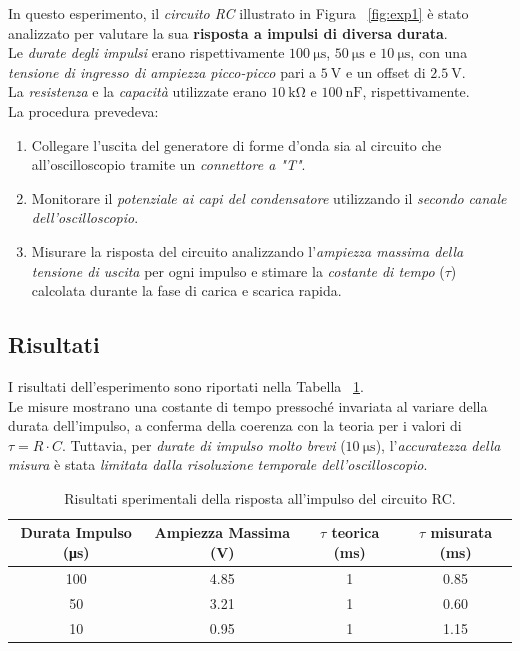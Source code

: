\documentclass[a4paper,10pt]{article}
\begin{document}
\begin{multicols}{2}
In questo esperimento, il \textit{circuito RC} illustrato in Figura ~\ref{fig:exp1} è stato analizzato per valutare la sua \textbf{risposta a impulsi di diversa durata}.\\
Le \textit{durate degli impulsi} erano rispettivamente \(\SI{100}{\micro\second}\), \(\SI{50}{\micro\second}\) e \(\SI{10}{\micro\second}\), con una \textit{tensione di ingresso di ampiezza picco-picco} pari a \(\SI{5}{\volt}\) e un offset di \(\SI{2.5}{\volt}\).\\
La \textit{resistenza} e la \textit{capacità} utilizzate erano \(\SI{10}{\kilo\ohm}\) e \(\SI{100}{\nano\farad}\), rispettivamente.\\
La procedura prevedeva:
\begin{enumerate}
    \item Collegare l'uscita del generatore di forme d’onda sia al circuito che all'oscilloscopio tramite un \textit{connettore a "T"}.
    \item Monitorare il \textit{potenziale ai capi del condensatore} utilizzando il \textit{secondo canale dell'oscilloscopio}.
    \item Misurare la risposta del circuito analizzando l’\textit{ampiezza massima della tensione di uscita} per ogni impulso e stimare la \textit{costante di tempo} (\(\tau\)) calcolata durante la fase di carica e scarica rapida.
\end{enumerate}

\end{multicols}

\subsection{Risultati}
I risultati dell’esperimento sono riportati nella Tabella ~\ref{tab:rc_impulse_response}.\\
Le misure mostrano una costante di tempo pressoché invariata al variare della durata dell’impulso, a conferma della coerenza con la teoria per i valori di \(\tau = R \cdot C\). Tuttavia, per \textit{durate di impulso molto brevi} (\(\SI{10}{\micro\second}\)), l’\textit{accuratezza della misura} è stata \textit{limitata dalla risoluzione temporale dell'oscilloscopio}.

\begin{table}[H]
\centering
\begin{tabular}{|c|c|c|c|}
\hline
\textbf{Durata Impulso (\si{\micro\second})} & \textbf{Ampiezza Massima (\si{\volt})} & \textbf{\(\tau\) teorica (\si{\milli\second})} & \textbf{\(\tau\) misurata (\si{\milli\second})} \\ \hline
100 & 4.85 & 1 & 0.85 \\ \hline
50 & 3.21 & 1 & 0.60 \\ \hline
10 & 0.95 & 1 & 1.15 \\ \hline
\end{tabular}
\caption{Risultati sperimentali della risposta all’impulso del circuito RC.}
\label{tab:rc_impulse_response}
\end{table}
\end{document}
